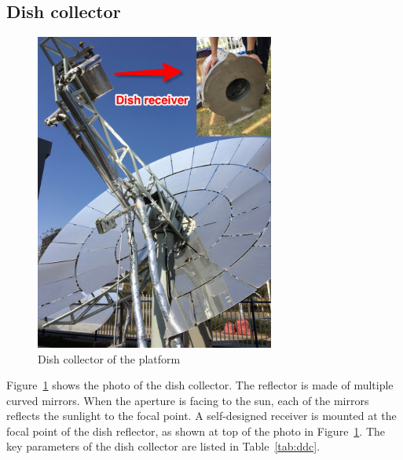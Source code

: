 \subsection{Dish collector}

\begin{figure}[!ht]
\centering
\includegraphics[width=0.7\textwidth]{fig/DishCollector.jpg}
\caption{Dish collector of the platform}\label{fig:DishCollector}
\end{figure}
Figure~\ref{fig:DishCollector} shows the photo of the dish collector. The reflector is made of multiple curved mirrors. When the aperture is facing to the sun, each of the mirrors reflects the sunlight to the focal point. 
A self-designed receiver is mounted at the focal point of the dish reflector, as shown at top of the photo in Figure~\ref{fig:DishCollector}.
The key parameters of the dish collector are listed in Table~\ref{tab:ddc}. 
